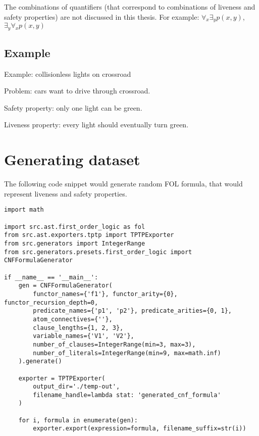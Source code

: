 The combinations of quantifiers (that correspond to combinations of liveness and safety properties) are not discussed in this thesis. For example: $\forall_x \exists_y p(x, y)$, $\exists_y \forall_x p(x, y)$

\subsection{Example}

Example: collisionless lights on crossroad

\noindent
Problem: cars want to drive through crossroad.

\noindent
Safety property: only one light can be green.

\noindent
Liveness property: every light should eventually turn green.

\section{Generating dataset}

The following code snippet would generate random \gls{FOL} formula, that would represent liveness and safety properties.

\begin{verbatim}
import math

import src.ast.first_order_logic as fol
from src.ast.exporters.tptp import TPTPExporter
from src.generators import IntegerRange
from src.generators.presets.first_order_logic import CNFFormulaGenerator

if __name__ == '__main__':
    gen = CNFFormulaGenerator(
        functor_names={'f1'}, functor_arity={0}, functor_recursion_depth=0,
        predicate_names={'p1', 'p2'}, predicate_arities={0, 1},
        atom_connectives={''},
        clause_lengths={1, 2, 3},
        variable_names={'V1', 'V2'},
        number_of_clauses=IntegerRange(min=3, max=3),
        number_of_literals=IntegerRange(min=9, max=math.inf)
    ).generate()

    exporter = TPTPExporter(
        output_dir='./temp-out',
        filename_handle=lambda stat: 'generated_cnf_formula'
    )

    for i, formula in enumerate(gen):
        exporter.export(expression=formula, filename_suffix=str(i))
\end{verbatim}

